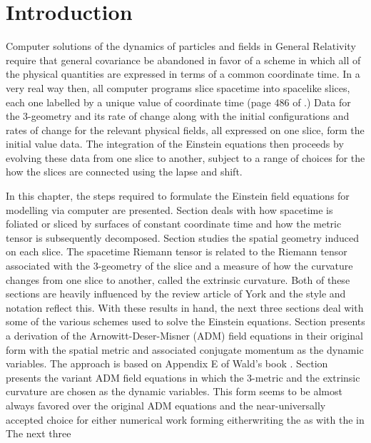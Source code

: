 
\section{Introduction}

Computer solutions of the dynamics of particles and fields in General Relativity
require that general covariance be abandoned in favor of a scheme
in which all of the physical quantities are expressed in terms of a common coordinate
time.
In a very real way then, all computer programs slice spacetime into spacelike slices, each one
labelled by a unique value of coordinate time (page 486 of .)
Data for the 3-geometry and its rate of change along with the initial configurations
and rates of change for the relevant physical fields, all expressed on one slice, form the
initial value data.
The integration of the Einstein equations then proceeds by evolving these data
from one slice to another, subject to a range of choices for the how
the slices are connected using the lapse and shift.

In this chapter, the steps required to formulate the Einstein field equations for modelling
via computer are presented.
Section  deals with how spacetime is foliated or sliced by surfaces of
constant coordinate time and how the metric tensor is subsequently decomposed.
Section  studies the spatial geometry induced on each slice.
The spacetime Riemann tensor is related to the Riemann tensor associated with the 3-geometry
of the slice and a measure of how the curvature changes from one slice to another,
called the extrinsic curvature.
Both of these sections are heavily influenced by the review article of York  and
the style and notation reflect this.
With these results in hand, the next three sections deal with some of the various schemes
used to solve the Einstein equations.  Section  presents a derivation of the
Arnowitt-Deser-Misner (ADM) field equations in their original form with the
spatial metric and associated conjugate momentum as the dynamic variables.  The approach is
based on Appendix E of Wald's book .
Section  presents the variant ADM field equations in which the 3-metric
and the extrinsic curvature are chosen as the dynamic variables.
This form seems to be almost always favored over the original ADM equations and the near-universally accepted choice for either numerical work
forming eitherwriting the as with the in The next three



